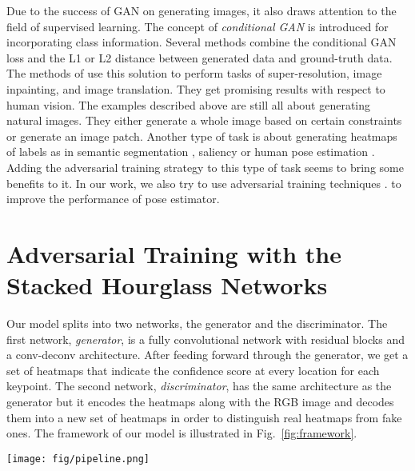\documentclass[10pt,twocolumn,letterpaper]{article}
\begin{document}
Due to the success of GAN on generating images, it also draws attention to the field of supervised learning. The concept of {\em conditional GAN} \cite{MirzaO14} is introduced for incorporating class information. Several methods combine the conditional GAN loss and the L1 or L2 distance between generated data and ground-truth data. The methods of \cite{IsolaZZE16,LedigTHCATTWS16,PathakKDDE16} use this solution to perform tasks of super-resolution, image inpainting, and image translation. They get promising results with respect to human vision. The examples described above are still all about generating natural images. They either generate a whole image based on certain constraints or generate an image patch. Another type of task is about generating heatmaps of labels as in semantic segmentation \cite{LucCCV16}, saliency \cite{PanCMOTSN17} or human pose estimation \cite{ChenSWLY17}. Adding the adversarial training strategy to this type of task seems to bring some benefits to it. In our work, we also try to use adversarial training techniques \cite{BerthelotSM17}.
to improve the performance of pose estimator. 





\section{Adversarial Training with the Stacked Hourglass Networks}

Our model splits into two networks, the generator and the discriminator. The first network, {\em generator}, is a fully convolutional network with residual blocks and a conv-deconv architecture. After feeding forward through the generator, we get a set of heatmaps that indicate the confidence score at every location for each keypoint. The second network, {\em discriminator}, has the same architecture as the generator but it encodes the heatmaps along with the RGB image and decodes them into a new set of heatmaps in order to distinguish real heatmaps from fake ones. The framework of our model is illustrated in Fig.~\ref{fig:framework}.

\begin{figure*}[tb]
    \centering
    \texttt{[image: fig/pipeline.png]}
    \caption{ The framework of our adversarial networks. We incorporate a ConvNet-based pose estimator as the generator (on the left) with a discriminator (on the right) that aims to distinguish the generated heatmaps from the ground-truth heatmaps by reconstructing the input heatmaps. The generator and the discriminator have the same architecture.}
    \label{fig:framework}
\end{figure*}
\end{document}
